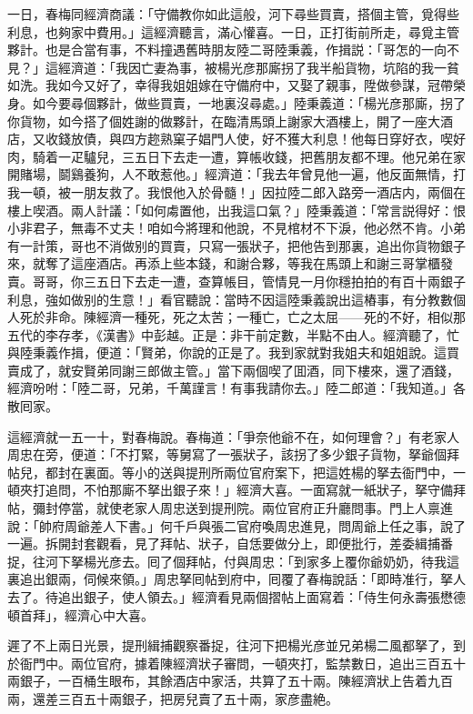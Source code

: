 一日，春梅同經濟商議：「守備教你如此這般，河下尋些買賣，搭個主管，覓得些利息，也夠家中費用。」這經濟聽言，滿心懽喜。一日，正打街前所走，尋覓主管夥計。也是合當有事，不料撞遇舊時朋友陸二哥陸秉義，作揖説：「哥怎的一向不見？」這經濟道：「我因亡妻為事，被楊光彦那廝拐了我半船貨物，坑陷的我一貧如洗。我如今又好了，幸得我姐姐嫁在守備府中，又娶了親事，陞做參謀，冠帶榮身。如今要尋個夥計，做些買賣，一地裏沒尋處。」陸秉義道：「楊光彦那廝，拐了你貨物，如今搭了個姓謝的做夥計，在臨清馬頭上謝家大酒樓上，開了一座大酒店，又收錢放債，與四方趂熟窠子娼門人使，好不獲大利息！他每日穿好衣，喫好肉，騎着一疋驢兒，三五日下去走一遭，算帳收錢，把舊朋友都不理。他兄弟在家開賭場，鬬鷄養狗，人不敢惹他。」經濟道：「我去年曾見他一遍，他反面無情，打我一頓，被一朋友救了。我恨他入於骨髓！」因拉陸二郎入路旁一酒店内，兩個在樓上喫酒。兩人計議：「如何䖏置他，出我這口氣？」陸秉義道：「常言説得好：恨小非君子，無毒不丈夫！咱如今將理和他說，不見棺材不下淚，他必然不肯。小弟有一計策，哥也不消做别的買賣，只寫一張狀子，把他告到那裏，追出你貨物銀子來，就奪了這座酒店。再添上些本錢，和謝合夥，等我在馬頭上和謝三哥掌櫃發賣。哥哥，你三五日下去走一遭，查算帳目，管情見一月你穩拍拍的有百十兩銀子利息，強如做别的生意！」看官聽說：當時不因這陸秉義說出這樁事，有分教數個人死於非命。陳經濟一種死，死之太苦；一種亡，亡之太屈——死的不好，相似那五代的李存孝，《漢書》中彭越。正是：非干前定數，半點不由人。經濟聽了，忙與陸秉義作揖，便道：「賢弟，你說的正是了。我到家就對我姐夫和姐姐說。這買賣成了，就安賢弟同謝三郎做主管。」當下兩個喫了囬酒，同下樓來，還了酒錢，經濟吩咐：「陸二哥，兄弟，千萬謹言！有事我請你去。」陸二郎道：「我知道。」各散囘家。

這經濟就一五一十，對春梅說。春梅道：「爭奈他爺不在，如何理會？」有老家人周忠在旁，便道：「不打緊，等舅寫了一張狀子，該拐了多少銀子貨物，拏爺個拜帖兒，都封在裏面。等小的送與提刑所兩位官府案下，把這姓楊的拏去衙門中，一頓夾打追問，不怕那廝不拏出銀子來！」經濟大喜。一面寫就一紙狀子，拏守備拜帖，彌封停當，就使老家人周忠送到提刑院。兩位官府正升廳問事。門上人禀進說：「帥府周爺差人下書。」何千戶與張二官府喚周忠進見，問周爺上任之事，說了一遍。拆開封套觀看，見了拜帖、狀子，自恁要做分上，即便批行，差委緝捕番捉，往河下拏楊光彦去。囘了個拜帖，付與周忠：「到家多上覆你爺奶奶，待我這裏追出銀兩，伺候來領。」周忠拏囘帖到府中，囘覆了春梅說話：「即時准行，拏人去了。待追出銀子，使人領去。」經濟看見兩個摺帖上面寫着：「侍生何永壽張懋德頓首拜」，經濟心中大喜。

遲了不上兩日光景，提刑緝捕觀察番捉，往河下把楊光彦並兄弟楊二風都拏了，到於衙門中。兩位官府，據着陳經濟狀子審問，一頓夾打，監禁數日，追出三百五十兩銀子，一百桶生眼布，其餘酒店中家活，共算了五十兩。陳經濟狀上告着九百兩，還差三百五十兩銀子，把房兒賣了五十兩，家彦盡絶。

